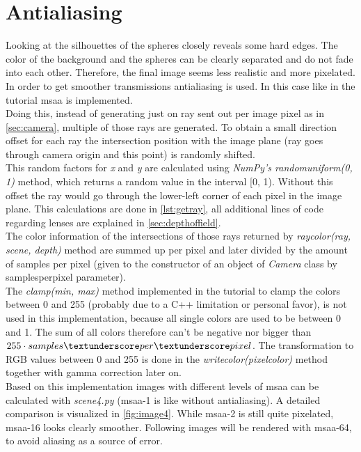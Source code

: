 \documentclass[]{article}
\begin{document}
	\section{Antialiasing}
	\label{sec:antialiasing}
	Looking at the silhouettes of the spheres closely reveals some hard edges. The color of the background and the spheres can be clearly separated and do not fade into each other. Therefore, the final image seems less realistic and more pixelated. In order to get smoother transmissions antialiasing is used. In this case like in the tutorial \ac{msaa} is implemented.
	\\
	Doing this, instead of generating just on ray sent out per image pixel as in \cref{sec:camera}, multiple of those rays are generated. To obtain a small direction offset for each ray the intersection position with the image plane (ray goes through camera origin and this point) is randomly shifted.
	\\
	This random factors for \emph{x} and \emph{y} are calculated using \emph{NumPy’s random\textunderscore uniform(0, 1)} method, which returns a random value in the interval [0, 1). Without this offset the ray would go through the lower-left corner of each pixel in the image plane. This calculations are done in \cref{lst:getray}, all additional lines of code regarding lenses are explained in \cref{sec:depthoffield}.
	\\
	The color information of the intersections of those rays returned by \emph{ray\textunderscore color(ray, scene, depth)} method are summed up per pixel and later divided by the amount of samples per pixel (given to the constructor of an object of \emph{Camera} class by samples\textunderscore per\textunderscore pixel parameter). 
	\\
	The \emph{clamp(min, max)} method implemented in the tutorial to clamp the colors between 0 and 255 (probably due to a C++ limitation or personal favor), is not used in this implementation, because all single colors are used to be between 0 and 1. The sum of all colors therefore can’t be negative nor bigger than $255\cdot  samples\textunderscore per\textunderscore pixel$. The transformation to RGB values between 0 and 255 is done in the \emph{write\textunderscore color(pixel\textunderscore color)} method together with gamma correction later on.
	\\
	Based on this implementation images with different levels of \ac{msaa} can be calculated with \emph{scene4.py} (\ac{msaa}-1 is like without antialiasing). A detailed comparison is visualized in \cref{fig:image4}. While \ac{msaa}-2 is still quite pixelated, \ac{msaa}-16 looks clearly smoother. Following images will be rendered with \ac{msaa}-64, to avoid aliasing as a source of error.
	
\end{document}
